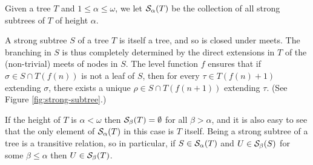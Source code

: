 \noindent Given a tree $T$ and $1 \leq \alpha \leq \omega$, we let $\mathcal{S}_{\alpha}({T})$ be the collection of all strong subtrees of $T$ of height $\alpha$.

A strong subtree $S$ of a tree $T$ is itself a tree, and so is closed under meets. The branching in $S$ is thus completely determined by the direct extensions in $T$ of the (non-trivial) meets of nodes in $S$. The level function $f$ ensures that if $\sigma\in S\cap T(f(n))$ is not a leaf of $S$, then for every $\tau\in T(f(n)+1)$ extending $\sigma$, there exists a unique $\rho\in S\cap T(f(n+1))$ extending $\tau$. (See Figure \ref{fig:strong-subtree}.)

If the height of $T$ is $\alpha < \omega$ then $\mathcal{S}_{\beta}({T}) = \emptyset$ for all $\beta > \alpha$, and it is also easy to see that the only element of $\mathcal{S}_{\alpha}({T})$ in this case is $T$ itself. Being a strong subtree of a tree is a transitive relation, so in particular, if $S \in \mathcal{S}_{\alpha}({T})$ and $U \in \mathcal{S}_{\beta}({S})$ for some $\beta \leq \alpha$ then $U \in \mathcal{S}_{\beta}({T})$.


